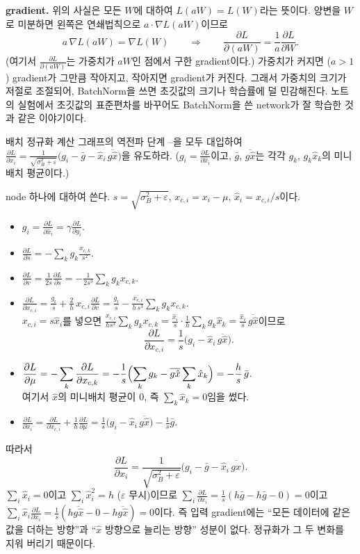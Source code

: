 \documentclass[11pt,a4paper]{article}
\newcommand{\pd}[2]{\frac{\partial #1}{\partial #2}}
\begin{document}
\begin{problems}
\begin{sol}
\textbf{gradient.} 위의 사실은 모든 $W$에 대하여 $L(aW)=L(W)$라는 뜻이다.
양변을 $W$로 미분하면 왼쪽은 연쇄법칙으로 $a\cdot\nabla L(aW)$이므로
\[
a\,\nabla L(aW)=\nabla L(W)\qquad\Longrightarrow\qquad
\pd{L}{(aW)}=\frac1a\pd{L}{W}.
\]
(여기서 $\pd{L}{(aW)}$는 가중치가 $aW$인 점에서 구한 gradient이다.)
가중치가 커지면 ($a>1$) gradient가 그만큼 작아지고, 작아지면 gradient가 커진다.
그래서 가중치의 크기가 저절로 조절되어, BatchNorm을 쓰면 초깃값의 크기나 학습률에 덜 민감해진다.
노트의 실험에서 초깃값의 표준편차를 바꾸어도 BatchNorm을 쓴 network가 잘 학습한 것과 같은 이야기이다.
\end{sol}

\item 배치 정규화 계산 그래프의 역전파 단계 --을 모두 대입하여
$\pd{L}{x_i}=\frac{1}{\sqrt{\sigma_B^2+\varepsilon}}\bigl(g_i-\bar g-\hat x_i\,\overline{g\hat x}\bigr)$을 유도하라.
($g_i=\pd{L}{\hat x_i}$이고, $\bar g$, $\overline{g\hat x}$는 각각 $g_k$, $g_k\hat x_k$의 미니배치 평균이다.)

\begin{sol}
node 하나에 대하여 쓴다. $s=\sqrt{\sigma_B^2+\varepsilon}$, $x_{c,i}=x_i-\mu$, $\hat x_i=x_{c,i}/s$이다.
\begin{itemize}[leftmargin=2.2em,itemsep=4pt]
\item[\ding{173}] $g_i=\pd{L}{\hat x_i}=\gamma\pd{L}{y_i}$.
\item[\ding{174}] $\displaystyle\pd{L}{s}=-\sum_k g_k\frac{x_{c,k}}{s^2}$.
\item[\ding{175}] $\displaystyle\pd{L}{v}=\frac{1}{2s}\pd{L}{s}=-\frac{1}{2s^3}\sum_k g_kx_{c,k}$.
\item[\ding{176}] $\displaystyle\pd{L}{x_{c,i}}=\frac{g_i}{s}+\frac2h\,x_{c,i}\pd{L}{v}
=\frac{g_i}{s}-\frac{x_{c,i}}{h\,s^3}\sum_kg_kx_{c,k}.$\\[2pt]
$x_{c,i}=s\hat x_i$를 넣으면 $\displaystyle\frac{x_{c,i}}{h s^3}\sum_k g_kx_{c,k}=\frac{\hat x_i}{s}\cdot\frac1h\sum_kg_k\hat x_k=\frac{\hat x_i}{s}\,\overline{g\hat x}$이므로
\[
\pd{L}{x_{c,i}}=\frac1s\bigl(g_i-\hat x_i\,\overline{g\hat x}\bigr).
\]
\item[\ding{177}] $\displaystyle\pd{L}{\mu}=-\sum_k\pd{L}{x_{c,k}}=-\frac1s\Bigl(\sum_kg_k-\overline{g\hat x}\sum_k\hat x_k\Bigr)=-\frac hs\,\bar g$.\\[2pt]
여기서 $\hat x$의 미니배치 평균이 $0$, 즉 $\sum_k\hat x_k=0$임을 썼다.
\item[\ding{178}] $\displaystyle\pd{L}{x_i}=\pd{L}{x_{c,i}}+\frac1h\pd{L}{\mu}
=\frac1s\bigl(g_i-\hat x_i\,\overline{g\hat x}\bigr)-\frac1s\bar g .$
\end{itemize}
따라서
\[
\boxed{\pd{L}{x_i}=\frac{1}{\sqrt{\sigma_B^2+\varepsilon}}\bigl(g_i-\bar g-\hat x_i\,\overline{g\hat x}\bigr)}.
\]
$\sum_i\hat x_i=0$이고 $\sum_i\hat x_i^2=h$ ($\varepsilon$ 무시)이므로
$\sum_i\pd{L}{x_i}=\frac1s(h\bar g-h\bar g-0)=0$이고 $\sum_i\hat x_i\pd{L}{x_i}=\frac1s(h\overline{g\hat x}-0-h\overline{g\hat x})=0$이다.
즉 입력 gradient에는 ``모든 데이터에 같은 값을 더하는 방향''과 ``$\hat x$ 방향으로 늘리는 방향'' 성분이 없다.
정규화가 그 두 변화를 지워 버리기 때문이다.
\end{sol}


\end{problems}
\end{document}
